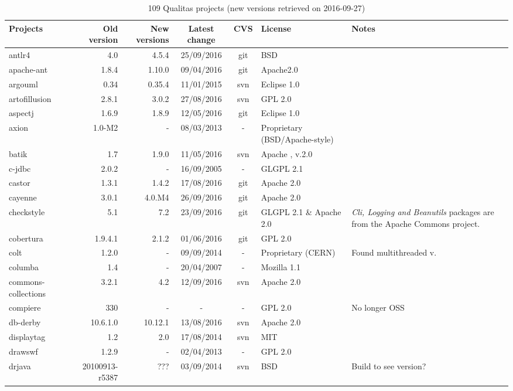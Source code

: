 \documentclass{sig-alternate-05-2015}
\begin{document}
\begin{table}
	\centering
	\caption{109 Qualitas projects (new versions retrieved on 2016-09-27)}
	\label{t:new_and_old}
	\small
		\begin{tabular}{l|r|r|c|c|p{3cm}|p{3cm}}
			\hline 
			Projects & Old version & New versions & Latest change & CVS & License & Notes \\
			\hline
			antlr4 & 4.0 & 4.5.4 & 25/09/2016 & git & BSD \\
			apache-ant & 1.8.4 & 1.10.0 & 09/04/2016 & git & Apache2.0 \\
			argouml & 0.34 & 0.35.4 & 11/01/2015 	& svn & Eclipse  1.0 \\
			artofillusion & 2.8.1 & 3.0.2 & 27/08/2016 & svn & GPL 2.0 \\
			aspectj & 1.6.9 & 1.8.9 & 12/05/2016 & git & Eclipse   1.0 \\
			axion & 1.0-M2 & - & 08/03/2013 & - & Proprietary (BSD/Apache-style) \\
			batik & 1.7 & 1.9.0 & 11/05/2016 & svn & Apache , v.2.0 \\
			c-jdbc & 2.0.2 & - & 16/09/2005 & - & GLGPL 2.1 \\
			castor & 1.3.1 & 1.4.2 & 17/08/2016 & git & Apache 2.0 \\
			cayenne & 3.0.1 & 4.0.M4 &  26/09/2016 & git & Apache 2.0 \\
			checkstyle & 5.1 & 7.2  & 23/09/2016 & git & GLGPL 2.1 \& Apache 2.0 & \textit{Cli, Logging and Beanutils} packages are from the Apache Commons project. \\
			cobertura & 1.9.4.1 & 2.1.2 & 01/06/2016 & git & GPL 2.0  \\
			colt & 1.2.0 & - & 09/09/2014 & - & Proprietary (CERN) & Found multithreaded v. \\
			columba & 1.4 & - & 20/04/2007 & - & Mozilla   1.1  \\
			commons-collections & 3.2.1 & 4.2 & 12/09/2016 & svn & Apache 2.0 \\
			compiere & 330 & - & - & - & GPL 2.0 & No longer OSS \\
			db-derby & 10.6.1.0 & 10.12.1 & 13/08/2016 & svn & Apache 2.0 \\
			displaytag & 1.2 & 2.0 & 17/08/2014 & svn & MIT  \\
			drawswf & 1.2.9 & - & 02/04/2013 & - & GPL 2.0 \\
			drjava & 20100913-r5387 & ??? & 03/09/2014 & svn & BSD  & Build to see version? \\

\end{tabular}
\end{table}
\end{document}
